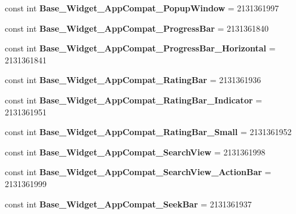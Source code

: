 \begin{DoxyCompactItemize}
const int {\bfseries Base\+\_\+\+Widget\+\_\+\+App\+Compat\+\_\+\+Popup\+Window} = 2131361997
\item 
\mbox{\label{classXaria_1_1Resource_1_1Style_a85372f67b249cb0b51e8d59336eef73f}} 
const int {\bfseries Base\+\_\+\+Widget\+\_\+\+App\+Compat\+\_\+\+Progress\+Bar} = 2131361840
\item 
\mbox{\label{classXaria_1_1Resource_1_1Style_a713993c64ed2a863a466ab05946df95f}} 
const int {\bfseries Base\+\_\+\+Widget\+\_\+\+App\+Compat\+\_\+\+Progress\+Bar\+\_\+\+Horizontal} = 2131361841
\item 
\mbox{\label{classXaria_1_1Resource_1_1Style_a5a0c49e3f62210bb97cf8e16e625d9a1}} 
const int {\bfseries Base\+\_\+\+Widget\+\_\+\+App\+Compat\+\_\+\+Rating\+Bar} = 2131361936
\item 
\mbox{\label{classXaria_1_1Resource_1_1Style_a073ee482eb013d7f9823d2be42fa60f8}} 
const int {\bfseries Base\+\_\+\+Widget\+\_\+\+App\+Compat\+\_\+\+Rating\+Bar\+\_\+\+Indicator} = 2131361951
\item 
\mbox{\label{classXaria_1_1Resource_1_1Style_af82b85566715aeb011a194092542a0dc}} 
const int {\bfseries Base\+\_\+\+Widget\+\_\+\+App\+Compat\+\_\+\+Rating\+Bar\+\_\+\+Small} = 2131361952
\item 
\mbox{\label{classXaria_1_1Resource_1_1Style_a55789e7209757fddd3419fd54a10ff74}} 
const int {\bfseries Base\+\_\+\+Widget\+\_\+\+App\+Compat\+\_\+\+Search\+View} = 2131361998
\item 
\mbox{\label{classXaria_1_1Resource_1_1Style_a8c9c0374f47376e29b100ee22c53aaec}} 
const int {\bfseries Base\+\_\+\+Widget\+\_\+\+App\+Compat\+\_\+\+Search\+View\+\_\+\+Action\+Bar} = 2131361999
\item 
\mbox{\label{classXaria_1_1Resource_1_1Style_a9800e69c28af8aaf5da0fefc880d5d24}} 
const int {\bfseries Base\+\_\+\+Widget\+\_\+\+App\+Compat\+\_\+\+Seek\+Bar} = 2131361937
\item 

\end{DoxyCompactItemize}
